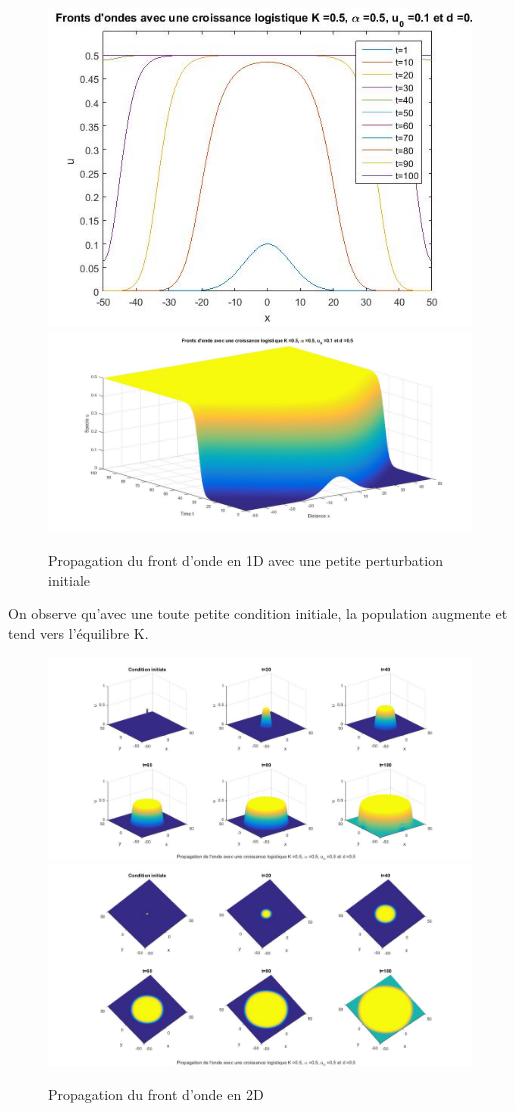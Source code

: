 \documentclass[a4paper,11pt]{article}
\begin{document}
\begin{figure}[H]
	\centering
	\includegraphics[width=0.45\linewidth]{SimulationKPP/TrigerEffect/fronts}\hfill
	\includegraphics[width=0.55\linewidth]{SimulationKPP/TrigerEffect/Surf}\hfill
	\caption{Propagation du front d'onde en 1D avec une petite perturbation initiale}
\end{figure}
\noindent
On observe qu'avec une toute petite condition initiale, la population augmente et tend vers l'équilibre K.  


\begin{figure}[H]
	\centering
	\includegraphics[width=1\linewidth]{SimulationKPP/KPP13}\hfill
    \includegraphics[width=1\linewidth]{SimulationKPP/KPP15}
    \caption{Propagation du front d'onde en 2D }
\end{figure}
\end{document}
